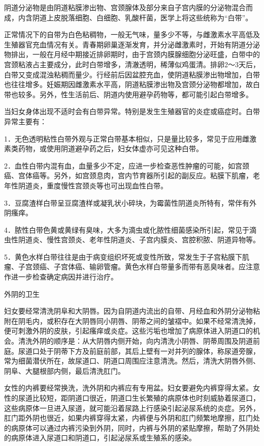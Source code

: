 \documentclass[12pt,UTF8,openany]{ctexbook}
\begin{document}
阴道分泌物是由阴道粘膜渗出物、宫颈腺体及部分来自子宫内膜的分泌物混合而成，内含阴道上皮脱落细胞、白细胞、乳酸杆菌，医学上将这些统称为“白带”。

正常情况下的自带为白色粘稠物，一般无气味，量多少不等，与雌激素水平高低及生殖器官充血情况有关。青春期卵巢逐渐发育，并分泌雌激素时，开始有阴道分泌物排出，一般在月经中期接近排卵期时，由于宫颈内膜腺细胞分泌旺盛，白带中的宫颈粘液占主要成分，此时白带增多，清澈透明，稀薄似鸡蛋清。排卵2～3天后，白带又变成混浊粘稠而量少。行经前后因盆腔充血，使阴道粘膜渗出物增加，白带也往往增多。妊娠期因雌激素水平高，阴道粘膜渗出物及宫颈分泌物都增加，故白带也较多。另外，性生活前后、阴道内使用避孕药物等，都可能引起白带增多。

当妇女身体出现不适时会有白带异常。特别是发生生殖器官的炎症或癌症时。白带异常主要有：

1．无色透明粘性白带外观与正常白带基本相似，只是量比较多，常见于应用雌激素类药物，或使用阴道避孕药之后，妇女体虚亦可见这种白带。

2．血性白带内混有血，血量多少不定，应进一步检查恶性肿瘤的可能，如宫颈癌、宫体癌等。另外，如宫颈息肉，宫内节育器所引起的副反应。粘膜下肌瘤，老年性阴道炎，重度慢性宫颈炎等也可出现血性白带。

3．豆腐渣样白带呈豆腐渣样或凝乳状小碎块，为霉菌性阴道炎所特有，常伴有外阴瘙痒。

4．脓性白带色黄或黄绿有臭味，大多为滴虫或化脓性细菌感染所引起，常见于滴虫性阴道炎、慢性宫颈炎、老年性阴道炎、子宫内膜炎、宫腔积脓、阴道异物等。

5．黄色水样白带往往是由于病变组织坏死或变性所致，常发生于子宫粘膜下肌瘤、子宫颈癌、子宫体癌、输卵管瘤。黄色水样白带量多而带有恶臭味者。应注意作进一步检查确定病因并进行治疗。

外阴的卫生

妇女要经常清洗阴阜和大阴唇。因为自阴道内流出的自带、月经血和外阴分泌物粘附在阴毛内，或积存在大阴唇同小阴唇、阴蒂之间的皱褶中。如果不经常清洗掉，便可刺激外阴的皮肤，引起瘙痒或炎症。这些污垢也增加了病原体进入阴道口的机会。清洗外阴的顺序是：从大阴唇内侧开始，向内清洗小阴唇、阴蒂周围及阴道前庭。尿道口处于阴蒂下方及前庭前部，其后上壁有一对并列的腺体，称尿道旁腺，常为细菌潜伏所在，故尿道口、阴道口周围应注意清洗。然后，清洗大阴唇外侧、阴阜、大腿根部内侧，最后清洗肛门。

女性的内裤要经常换洗，洗外阴和内裤应有专用盆。妇女要避免内裤穿得太紧。女性的尿道比较短，距阴道口很近，阴道口生长繁殖的病原体也时刻威胁着尿道口，这些病原体一旦进入尿道，就可能沿着尿路上行感染引起泌尿系统的炎症。另外，肛门距外阴也很近，如果内裤穿得太紧，内裤便与外阴和肛门频繁地摩擦，肛门处的病原体可以通过内裤污染到外阴，同时，内裤与外阴的紧贴摩擦，帮助了外阴处的病原体进入尿道口和阴道口，引起泌尿系或生殖系的感染。
\end{document}
